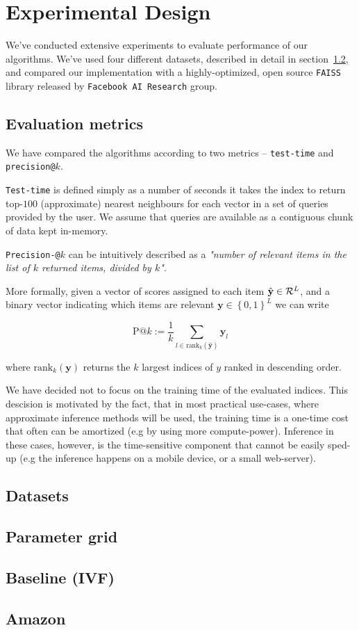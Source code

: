 \section{Experimental Design}

    We've conducted extensive experiments to evaluate performance of our algorithms. We've used
    four different datasets, described in detail in section~\ref{sec:datasets}, and compared
    our implementation with a highly-optimized, open source \texttt{FAISS} library released by
    \texttt{Facebook AI Research} group.

    \subsection{Evaluation metrics}

        We have compared the algorithms according to two metrics -- \texttt{test-time}
        and \texttt{precision@}$k$.

        \texttt{Test-time} is defined simply as a number of seconds it takes the index to return
        top-$100$ (approximate) nearest neighbours for each vector in a set of queries provided by the user.
        We assume that queries are available as a contiguous chunk of data kept in-memory.

        \texttt{Precision-@}$k$ can be intuitively described as a
        \textit{"number of relevant items in the list of $k$ returned items, divided by $k$".}

        More formally, given a vector of scores assigned to each item $\hat{\mathbf y} \in {\cal{R}}^{L}$, and a
        binary vector indicating which items are relevant $\mathbf y \in \left\lbrace 0, 1 \right\rbrace^L$
        we can write

        \begin{equation}
            \text{P}@k := \frac{1}{k} \sum_{l\in \text{rank}_k (\hat{\mathbf y})} \mathbf y_l
        \end{equation}

        where $\text{rank}_k(\mathbf y)$ returns the $k$ largest indices of $y$ ranked in descending order.

        We have decided not to focus on the training time of the evaluated indices. This
        descision is motivated by the fact, that in most practical use-cases, where
        approximate inference methods will be used, the training time is a one-time cost that
        often can be amortized (e.g by using more compute-power).
        Inference in these cases, however, is the time-sensitive component
        that cannot be easily sped-up (e.g the inference happens on a mobile device, or a small web-server).

    \subsection{Datasets}\label{sec:datasets}


    \subsection{Parameter grid}


    \subsection{Baseline (IVF)}


    \subsection{Amazon}